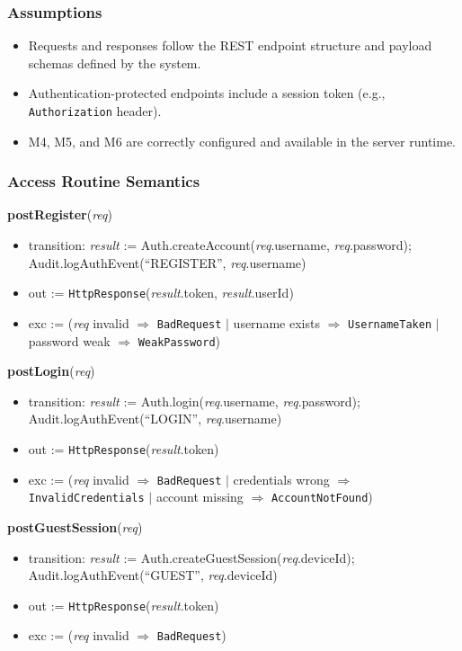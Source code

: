 \documentclass[12pt, titlepage]{article}
\begin{document}
\subsubsection{Assumptions}
\begin{itemize}
    \item Requests and responses follow the REST endpoint structure and payload schemas defined by the system.
    \item Authentication-protected endpoints include a session token (e.g., \texttt{Authorization} header).
    \item M4, M5, and M6 are correctly configured and available in the server runtime.
\end{itemize}

\subsubsection{Access Routine Semantics}

\noindent\textbf{postRegister}(\textit{req})
\begin{itemize}
    \item transition: \textit{result} := Auth.createAccount(\textit{req}.username, \textit{req}.password); Audit.logAuthEvent(``REGISTER'', \textit{req}.username)
    \item out := \texttt{HttpResponse}(\textit{result}.token, \textit{result}.userId)
    \item exc := (\textit{req} invalid $\Rightarrow$ \texttt{BadRequest} $|$ username exists $\Rightarrow$ \texttt{UsernameTaken} $|$ password weak $\Rightarrow$ \texttt{WeakPassword})
\end{itemize}

\noindent\textbf{postLogin}(\textit{req})
\begin{itemize}
    \item transition: \textit{result} := Auth.login(\textit{req}.username, \textit{req}.password); Audit.logAuthEvent(``LOGIN'', \textit{req}.username)
    \item out := \texttt{HttpResponse}(\textit{result}.token)
    \item exc := (\textit{req} invalid $\Rightarrow$ \texttt{BadRequest} $|$ credentials wrong $\Rightarrow$ \texttt{InvalidCredentials} $|$ account missing $\Rightarrow$ \texttt{AccountNotFound})
\end{itemize}

\noindent\textbf{postGuestSession}(\textit{req})
\begin{itemize}
    \item transition: \textit{result} := Auth.createGuestSession(\textit{req}.deviceId); Audit.logAuthEvent(``GUEST'', \textit{req}.deviceId)
    \item out := \texttt{HttpResponse}(\textit{result}.token)
    \item exc := (\textit{req} invalid $\Rightarrow$ \texttt{BadRequest})
\end{itemize}
\end{document}
